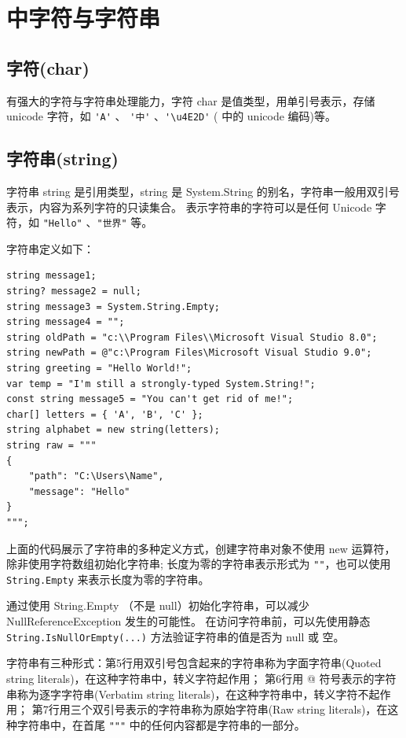 \section{\cs 中字符与字符串}

\subsection{字符(char)}

\cs 有强大的字符与字符串处理能力，字符 char 是值类型，用单引号表示，存储 unicode 字符，如
\verb|'A'| 、 \verb|'中'| 、\verb|'\u4E2D'| ( 中的 unicode 编码)等。

\subsection{字符串(string)}
字符串 string 是引用类型，string 是 System.String 的别名，字符串一般用双引号表示，内容为系列字符的只读集合。
表示字符串的字符可以是任何 Unicode 字符，如 \verb|"Hello"| 、\verb|"世界"| 等。

字符串定义如下：

\begin{lstlisting}
string message1;
string? message2 = null;
string message3 = System.String.Empty;
string message4 = "";
string oldPath = "c:\\Program Files\\Microsoft Visual Studio 8.0";
string newPath = @"c:\Program Files\Microsoft Visual Studio 9.0";
string greeting = "Hello World!";
var temp = "I'm still a strongly-typed System.String!";
const string message5 = "You can't get rid of me!";
char[] letters = { 'A', 'B', 'C' };
string alphabet = new string(letters);
string raw = """
{
    "path": "C:\Users\Name",
    "message": "Hello"
}
""";
\end{lstlisting}

上面的代码展示了字符串的多种定义方式，创建字符串对象不使用 new 运算符，除非使用字符数组初始化字符串;
长度为零的字符串表示形式为 \verb|""|，也可以使用 \verb|String.Empty| 来表示长度为零的字符串。

通过使用 String.Empty （不是 null）初始化字符串，可以减少 NullReferenceException 发生的可能性。
在访问字符串前，可以先使用静态 \verb|String.IsNullOrEmpty(...)| 方法验证字符串的值是否为 null 或 空。

字符串有三种形式：第5行用双引号包含起来的字符串称为字面字符串(Quoted string literals)，在这种字符串中，转义字符起作用；
第6行用 @ 符号表示的字符串称为逐字字符串(Verbatim string literals)，在这种字符串中，转义字符不起作用；
第7行用三个双引号表示的字符串称为原始字符串(Raw string literals)，在这种字符串中，在首尾 \verb|"""| 中的任何内容都是字符串的一部分。

